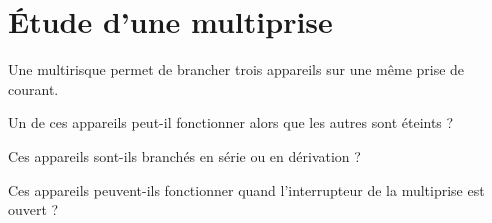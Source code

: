 \section{\'Etude d'une multiprise}

Une multirisque permet de brancher trois appareils sur une même prise de courant.

\begin{questions}
	\question Un de ces appareils peut-il fonctionner alors que les autres sont éteints ?
	
	\question Ces appareils sont-ils branchés en série ou en dérivation ?
	
	\question Ces appareils peuvent-ils fonctionner quand l'interrupteur de la multiprise est ouvert ?
\end{questions} 
